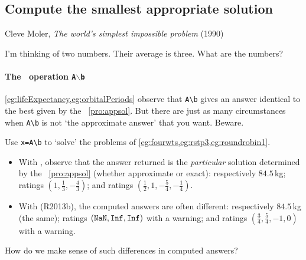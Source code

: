 \begin{comment}
\nakos{\S8.9} has some useful applications to USA NRL rating of quarterbacks---using data from \emph{The Sports Illustrated 19xx Sports Almanac}.
\end{comment}




\subsection{Compute the smallest appropriate solution}
\label{sec:csap}

\begin{quoted}{\parbox[t]{0.5\linewidth}{Cleve Moler, \emph{The world's simplest impossible problem} (1990)}}
I'm thinking of two numbers.  Their average is three.  What are the numbers?
\end{quoted}

\begin{comment}
Chapter~20 of the book by \cite{Higham1996} has some aspects of this section (including pseudo-inverse).
Matlab and Octave currently differ in that octave returns the smallest solution, but matlab returns a solution with at least \(m\)~nonzero elements??
\end{comment}

\paragraph{The \script\ operation \texttt{A$\backslash$b}}
\cref{eg:lifeExpectancy,eg:orbitalPeriods} observe that \verb|A\b| gives an answer identical to the best  given by the \svd\ \cref{pro:appsol}.
But there are just as many circumstances when \verb|A\b| is not `the approximate answer' that you want.
Beware.

\begin{example} 
Use \verb|x=A\b| to `solve' the problems of \cref{eg:fourwts,eg:rstp3,eg:roundrobin1}.
\begin{itemize}
\item With \script[2], observe that the answer returned is the \emph{particular} solution determined by the \svd\ \cref{pro:appsol} (whether approximate or exact): 
respectively \(84.5\)\,kg; 
ratings \((1,\frac13,-\frac43)\); and 
ratings \((\frac12,1,-\frac54,-\frac14)\). %
\item With \script[1] (R2013b), the computed answers are often different: 
respectively \(84.5\)\,kg (the same); 
ratings \((\verb|NaN|,\verb|Inf|,\verb|Inf|)\) with a warning; 
and ratings \((\tfrac34,\tfrac54,-1,0)\) with a warning. %
\end{itemize}
How do we make sense of such differences in computed answers?
\end{example}

